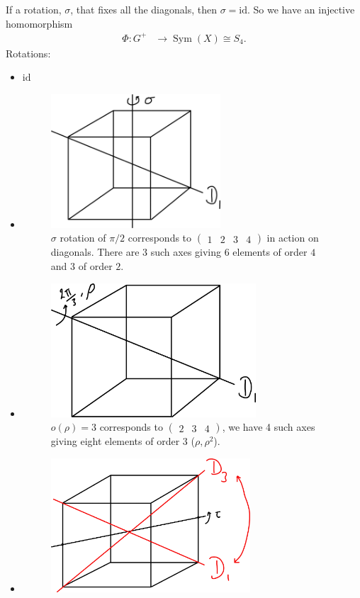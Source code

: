 If a rotation, $\sigma$, that fixes all the diagonals, then $\sigma = \text{id}$.
So we have an injective homomorphism
\begin{align*}
    \Phi : G^+ &\to \operatorname{Sym}(X) \cong S_4.
\end{align*} 
Rotations: 
\begin{itemize}
    \item $\text{id}$
    \item \begin{figure} 
        \centering 
        \includegraphics[height=5cm]{figures/04-cube-rotated}
        \caption{$\sigma$ rotation of $\pi / 2$ corresponds to $\begin{pmatrix}1 & 2 & 3 & 4\end{pmatrix}$ in action on diagonals. There are $3$ such axes giving $6$ elements of order $4$ and $3$ of order $2$.}
    \end{figure}
    \item \begin{figure} 
        \centering 
        \includegraphics[height=5cm]{figures/07-cube-rotated-fixed-axis} 
        \caption{$o(\rho) = 3$ corresponds to $\begin{pmatrix}2 & 3 & 4\end{pmatrix}$, we have 4 such axes giving eight elements of order $3$ ($\rho, \rho^2$).}
    \end{figure}
    \item \begin{figure} 
        \centering 
        \includegraphics[height=5cm]{figures/07-cube-transpositions}

\end{figure}
\end{itemize}
